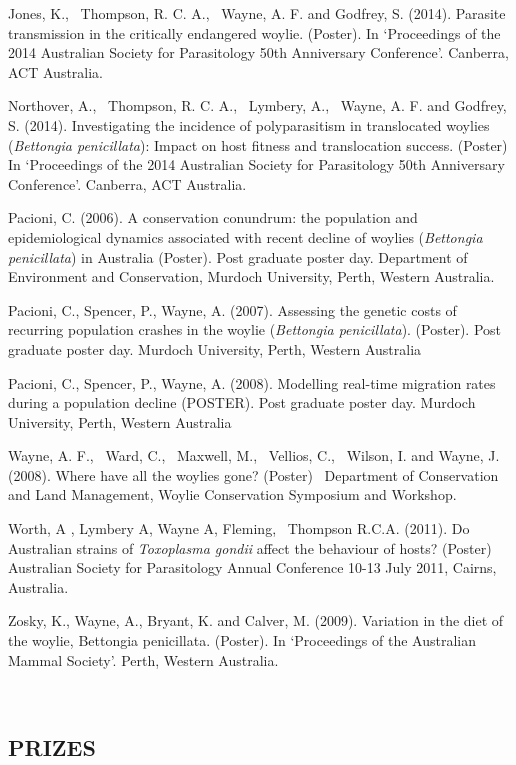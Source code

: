 \documentclass[version=last,
    paper=a4,                               %
    10pt,                                   %
    dvipsnames,
    oneside,                              %
    headings=openany,                       %
    open=any,
    BCOR=7mm,                               %
    DIV=15,     %
]{scrbook}
\begin{document}
Jones, K.,~ Thompson, R. C. A.,~ Wayne, A. F. and Godfrey, S. (2014).
Parasite transmission in the critically endangered woylie. (Poster). In
`Proceedings of the 2014 Australian Society for Parasitology 50th
Anniversary Conference'. Canberra, ACT Australia.

Northover, A.,~ Thompson, R. C. A.,~ Lymbery, A.,~ Wayne, A. F. and
Godfrey, S. (2014). Investigating the incidence of polyparasitism in
translocated woylies (\emph{Bettongia penicillata}): Impact on host
fitness and translocation success. (Poster) In `Proceedings of the 2014
Australian Society for Parasitology 50th Anniversary Conference'.
Canberra, ACT Australia.

Pacioni, C. (2006). A conservation conundrum: the population and
epidemiological dynamics associated with recent decline of woylies
(\emph{Bettongia penicillata}) in Australia (Poster). Post graduate
poster day. Department of Environment and Conservation, Murdoch
University, Perth, Western Australia.

Pacioni, C., Spencer, P., Wayne, A. (2007). Assessing the genetic costs
of recurring population crashes in the woylie (\emph{Bettongia
penicillata}). (Poster). Post graduate poster day. Murdoch University,
Perth, Western Australia

Pacioni, C., Spencer, P., Wayne, A. (2008). Modelling real-time
migration rates during a population decline (POSTER). Post graduate
poster day. Murdoch University, Perth, Western Australia

Wayne, A. F.,~ Ward, C.,~ Maxwell, M.,~ Vellios, C.,~ Wilson, I. and
Wayne, J. (2008). Where have all the woylies gone? (Poster) ~Department
of Conservation and Land Management, Woylie Conservation Symposium and
Workshop.

Worth, A , Lymbery A, Wayne A, Fleming,~ Thompson R.C.A. (2011). Do
Australian strains of \emph{Toxoplasma gondii} affect the behaviour of
hosts? (Poster) Australian Society for Parasitology Annual Conference
10-13 July 2011, Cairns, Australia.

Zosky, K., Wayne, A., Bryant, K. and Calver, M. (2009). Variation in the
diet of the woylie, Bettongia penicillata. (Poster). In `Proceedings of
the Australian Mammal Society'. Perth, Western Australia.

~

\subsection{PRIZES}
\end{document}
